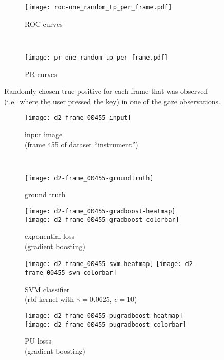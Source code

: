 \begin{figure}[ht]
	\centering
	\begin{subfigure}[h]{0.45\textwidth}
	\texttt{[image: roc-one\_random\_tp\_per\_frame.pdf]}	
		\caption*{ROC curves}
	\end{subfigure}
	~
	\begin{subfigure}[h]{0.45\textwidth}
	\texttt{[image: pr-one\_random\_tp\_per\_frame.pdf]}	
		\caption*{PR curves}
	\end{subfigure}
	\caption{Randomly chosen true positive for each frame that was observed (i.e.\ where the user pressed the key) in one of the gaze observations.}
	\label{fig:one-random-tp-per-frame}
\end{figure}


\begin{figure}[ht]
	\centering
 	\begin{subfigure}[h]{0.48\textwidth}
	  \texttt{[image: d2-frame\_00455-input]}
	  \caption*{input image \\ (frame 455 of dataset ``instrument'')}
	\end{subfigure}
	~
	\begin{subfigure}[h]{0.48\textwidth}
	  \texttt{[image: d2-frame\_00455-groundtruth]}
	  \caption*{ground truth \\ \quad}
	\end{subfigure}
	
	\vspace{3mm}
	\begin{subfigure}[h]{0.495\textwidth}
	  \texttt{[image: d2-frame\_00455-gradboost-heatmap]}
	  \texttt{[image: d2-frame\_00455-gradboost-colorbar]}
	  \caption*{exponential loss \\ (gradient boosting)}
	\end{subfigure}
	
	\vspace{3mm}
	\begin{subfigure}[h]{0.495\textwidth}
	  \texttt{[image: d2-frame\_00455-svm-heatmap]}
	  \texttt{[image: d2-frame\_00455-svm-colorbar]}
	  \caption*{SVM classifier \\ (rbf kernel with $\gamma = 0.0625$, $c = 10$)\\}
	\end{subfigure}	
	\begin{subfigure}[h]{0.495\textwidth}
	  \texttt{[image: d2-frame\_00455-pugradboost-heatmap]}
	  \texttt{[image: d2-frame\_00455-pugradboost-colorbar]}
		  \caption*{PU-losss \\ (gradient boosting)}
	\end{subfigure}		
	\caption{}
	\label{fig:bias-in-heatmaps}
\end{figure}


